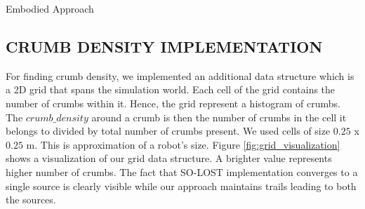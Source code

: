 \documentclass[letterpaper, 10 pt, conference]{ieeeconf}  %
\makeatletter
\def\BState{\State\hskip-\ALG@thistlm}
\makeatother
\begin{document}
\begin{algorithm}
\caption{Embodied Approach}\label{algorithm:1}
\end{algorithm}

\subsection{CRUMB DENSITY IMPLEMENTATION}

For finding crumb density, we implemented an additional data structure which is a 2D grid that spans the simulation world. Each cell of the grid contains the number of crumbs within it. Hence, the grid represent a histogram of crumbs. The $crumb\_density$ around a crumb is then the number of crumbs in the cell it belongs to divided by total number of crumbs present. We used cells of size $0.25$ x $ 0.25$  m. This is approximation of a robot's size. Figure \ref{fig:grid_visualization} shows a visualization of our grid data structure. A brighter value represents higher number of crumbs. The fact that SO-LOST implementation converges to a single source is clearly visible while our approach maintains trails leading to both the sources.
\end{document}

